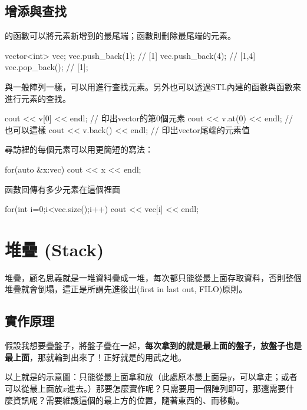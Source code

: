 \subsection{增添與查找}
的函數可以將元素新增到的最尾端；函數則刪除最尾端的元素。
\begin{C++}
vector<int> vec;
vec.push_back(1); // [1]
vec.push_back(4); // [1,4]
vec.pop_back(); // [1];
\end{C++}
\indent\indent{}與一般陣列一樣，可以用進行查找元素。另外也可以透過STL內建的函數與函數來進行元素的查找。
\begin{C++}
cout << v[0] << endl;
// 印出vector的第0個元素
cout << v.at(0) << endl;
// 也可以這樣
cout << v.back() << endl;
// 印出vector尾端的元素值
\end{C++}
\indent\indent 尋訪裡的每個元素可以用更簡短的寫法：
\begin{C++}
for(auto &x:vec){
	cout << x << endl;
}
\end{C++}
\indent\indent{}函數回傳有多少元素在這個裡面
\begin{C++}
for(int i=0;i<vec.size();i++)
	cout << vec[i] << endl;
\end{C++}

\section{堆疊 (Stack)}

堆疊，顧名思義就是一堆資料疊成一堆，每次都只能從最上面存取資料，否則整個堆疊就會倒塌，這正是所謂先進後出(first in last out, FILO)原則。

\subsection{實作原理}
假設我想要疊盤子，將盤子疊在一起，\textbf{每次拿到的就是最上面的盤子，放盤子也是最上面}，那就輪到出來了！正好就是的用武之地。
\begin{center}
\end{center}
以上就是的示意圖：只能從最上面拿和放（此處原本最上面是$y$，可以拿走；或者可以從最上面放$x$進去。）那要怎麼實作呢？只需要用一個陣列即可，那還需要什麼資訊呢？需要維護這個的最上方的位置，隨著東西的、而移動。

